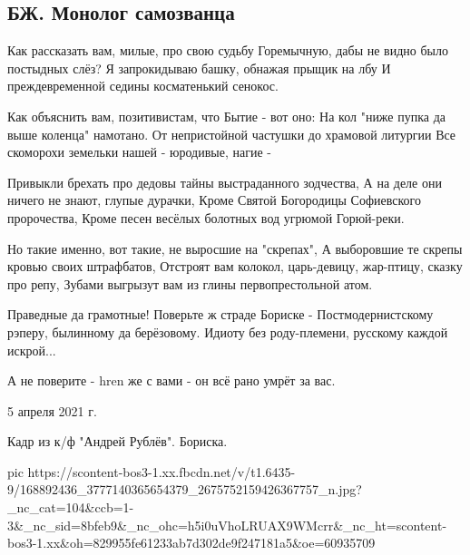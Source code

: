  
 
 
 
 

\subsection{БЖ. Монолог самозванца}
\label{sec:05_04_2021.fb.bilchenko_evgenia.5.monolog}

Как рассказать вам, милые, про свою судьбу 
Горемычную, дабы не видно было постыдных слёз?
Я запрокидываю башку, обнажая прыщик на лбу
И преждевременной седины косматенький сенокос.

Как объяснить вам, позитивистам, что Бытие - вот оно:
На кол "ниже пупка да выше коленца" намотано.
От непристойной частушки до храмовой литургии
Все скоморохи земельки нашей - юродивые, нагие -

Привыкли брехать про дедовы тайны выстраданного зодчества,
А на деле они ничего не знают, глупые дурачки,
Кроме Святой Богородицы Софиевского пророчества,
Кроме песен весёлых болотных вод угрюмой Горюй-реки.

Но такие именно, вот такие, не выросшие на "скрепах",
А выборовшие те скрепы кровью своих штрафбатов,
Отстроят вам колокол, царь-девицу, жар-птицу, сказку про репу,
Зубами выгрызут вам из глины первопрестольной атом.

Праведные да грамотные! Поверьте ж страде Бориске -
Постмодернистскому рэперу, былинному да берёзовому.
Идиоту без роду-племени, русскому каждой искрой...

А не поверите - hren же с вами - он всё рано умрёт за вас.

5 апреля 2021 г.

Кадр из к/ф "Андрей Рублёв". Бориска.

\ifcmt
  pic https://scontent-bos3-1.xx.fbcdn.net/v/t1.6435-9/168892436_3777140365654379_2675752159426367757_n.jpg?_nc_cat=104&ccb=1-3&_nc_sid=8bfeb9&_nc_ohc=h5i0uVhoLRUAX9WMcrr&_nc_ht=scontent-bos3-1.xx&oh=829955fe61233ab7d302de9f247181a5&oe=60935709
\fi

